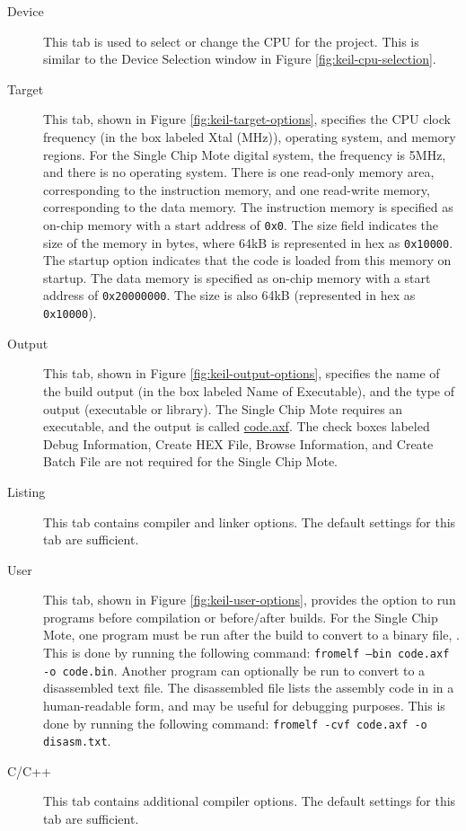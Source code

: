 \begin{description}
	\item[Device] This tab is used to select or change the CPU for the project. This is similar to the Device Selection window in Figure \ref{fig:keil-cpu-selection}.
	\item[Target] This tab, shown in Figure \ref{fig:keil-target-options}, specifies the CPU clock frequency (in the box labeled Xtal (MHz)), operating system, and memory regions. For the Single Chip Mote digital system, the frequency is 5MHz, and there is no operating system. There is one read-only memory area, corresponding to the instruction memory, and one read-write memory, corresponding to the data memory. The instruction memory is specified as on-chip memory with a start address of \texttt{0x0}. The size field indicates the size of the memory in bytes, where 64kB is represented in hex as \texttt{0x10000}. The startup option indicates that the code is loaded from this memory on startup. The data memory is specified as on-chip memory with a start address of \texttt{0x20000000}. The size is also 64kB (represented in hex as \texttt{0x10000}).
	\item[Output] This tab, shown in Figure \ref{fig:keil-output-options}, specifies the name of the build output (in the box labeled Name of Executable), and the type of output (executable or library). The Single Chip Mote requires an executable, and the output is called \url{code.axf}. The check boxes labeled Debug Information, Create HEX File, Browse Information, and Create Batch File are not required for the Single Chip Mote.
	\item[Listing] This tab contains compiler and linker options. The default settings for this tab are sufficient.
	\item[User] This tab, shown in Figure \ref{fig:keil-user-options}, provides the option to run programs before compilation or before/after builds. For the Single Chip Mote, one program must be run after the build to convert  to a binary file, . This is done by running the following command: \texttt{fromelf --bin code.axf -o code.bin}. Another program can optionally be run to convert  to a disassembled text file. The disassembled file lists the assembly code in  in a human-readable form, and may be useful for debugging purposes. This is done by running the following command: \texttt{fromelf -cvf code.axf -o disasm.txt}.
	\item[C/C++] This tab contains additional compiler options. The default settings for this tab are sufficient.

\end{description}
